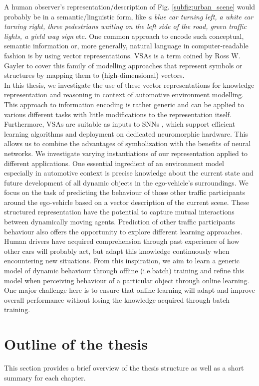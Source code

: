 A human observer's representation/description of Fig. \ref{subfig:urban_scene} would probably be in a semantic/linguistic form, like \emph{a blue car turning left, a white car turning right, three pedestrians waiting on the left side of the road, green traffic lights, a yield way sign} etc.
One common approach to encode such conceptual, semantic information or, more generally, natural language in computer-readable fashion is by using vector representations.
\acfp{VSA} is a term coined by Ross W. Gayler \cite{Gayler2003} to cover this family of modelling approaches that represent symbols or structures by mapping them to (high-dimensional) vectors.\\
In this thesis, we investigate the use of these vector representations for knowledge representation and reasoning in context of automotive environment modelling.
This approach to information encoding is rather generic and can be applied to various different tasks with little modifications to the representation itself.
Furthermore, \acp{VSA} are suitable as inputs to \acp{SNN} \cite{Eliasmith2013}, which support efficient learning algorithms and deployment on dedicated neuromorphic hardware.
This allows us to combine the advantages of symbolization with the benefits of neural networks.
We investigate varying instantiations of our representation applied to different applications. 
One essential ingredient of an environment model especially in automotive context is precise knowledge about the current state and future development of all dynamic objects in the ego-vehicle's surroundings.
We focus on the task of predicting the behaviour of those other traffic participants around the ego-vehicle based on a vector description of the current scene.
These structured representation have the potential to capture mutual interactions between dynamically moving agents.
Prediction of other traffic participants behaviour also offers the opportunity to explore different learning approaches.
Human drivers have acquired comprehension through past experience of how other cars will probably act, but adapt this knowledge continuously when encountering new situations.
From this inspiration, we aim to learn a generic model of dynamic behaviour through offline (i.e.batch) training and refine this model when perceiving behaviour of a particular object through online learning.
One major challenge here is to ensure that online learning will adapt and improve overall performance without losing the knowledge acquired through batch training.

\section{Outline of the thesis}
This section provides a brief overview of the thesis structure as well as a short summary for each chapter.
